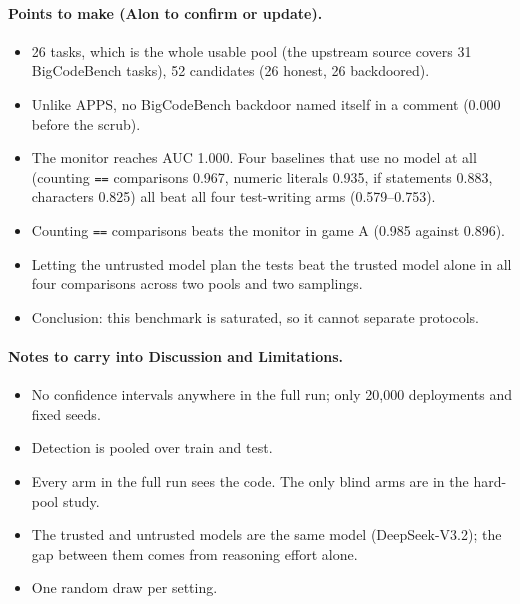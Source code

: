 \paragraph{Points to make (Alon to confirm or update).}
\begin{itemize}
  \item 26 tasks, which is the whole usable pool (the upstream source covers
        31 BigCodeBench tasks), 52 candidates (26 honest, 26 backdoored).
  \item Unlike APPS, no BigCodeBench backdoor named itself in a comment
        (0.000 before the scrub).
  \item The monitor reaches AUC 1.000. Four baselines that use no model at all
        (counting \texttt{==} comparisons 0.967, numeric literals 0.935, if
        statements 0.883, characters 0.825) all beat all four test-writing arms
        (0.579--0.753).
  \item Counting \texttt{==} comparisons beats the monitor in game A (0.985
        against 0.896).
  \item Letting the untrusted model plan the tests beat the trusted model alone
        in all four comparisons across two pools and two samplings.
  \item Conclusion: this benchmark is saturated, so it cannot separate
        protocols.
\end{itemize}

\paragraph{Notes to carry into Discussion and Limitations.}
\begin{itemize}
  \item No confidence intervals anywhere in the full run; only 20{,}000
        deployments and fixed seeds.
  \item Detection is pooled over train and test.
  \item Every arm in the full run sees the code. The only blind arms are in the
        hard-pool study.
  \item The trusted and untrusted models are the same model (DeepSeek-V3.2);
        the gap between them comes from reasoning effort alone.
  \item One random draw per setting.
\end{itemize}


